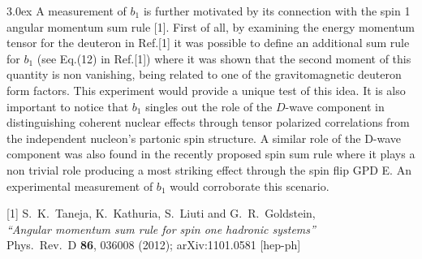 \documentclass[
preprint,
aps,prd,
nofootinbib,
superscriptaddress,
tightenlines,
amsmath,
amssymb
]{revtex4}
\begin{document}
\baselineskip 3.0ex
A measurement of $b_1$ is further motivated by its connection with the spin 1 angular momentum sum rule [1]. 
First of all, by examining the energy momentum tensor for the deuteron in Ref.[1] it was possible to define an additional sum rule for $b_1$ (see Eq.(12) in Ref.[1]) where it was shown that the second moment of this quantity is non vanishing, being related to one of the gravitomagnetic deuteron form factors.  This experiment would provide a unique test of this idea.
It is also important to notice that $b_1$ singles out the role of the $D$-wave component in distinguishing coherent nuclear effects through tensor polarized correlations  from  the independent nucleon's partonic spin structure. 
A similar role of the D-wave component was also found in the recently proposed spin sum rule where it plays a non trivial role 
producing a most striking effect through the spin flip GPD E. An experimental measurement of $b_1$ would corroborate this scenario.  


[1]  S.~K.~Taneja, K.~Kathuria, S.~Liuti and G.~R.~Goldstein, \\
{\em  ``Angular momentum sum rule for spin one hadronic systems''} \\ 
Phys.\ Rev.\ D {\bf 86}, 036008 (2012);
 arXiv:1101.0581 [hep-ph]
\end{document}
